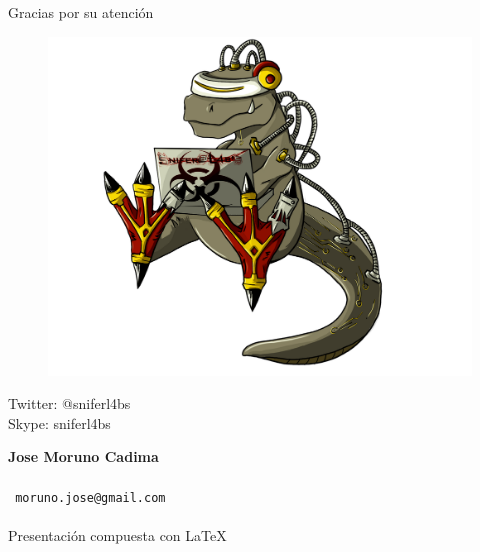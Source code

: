 \documentclass[12pt]{beamer} %
\makeatletter
\def\autor{
  Jose Moruno Cadima\\
}
\def\email{
  moruno.jose@gmail.com\\

}
\makeatother
\begin{document}
\begin{slide}
  \begin{exampleblock}{}
    LOS ACTOS PRESENTES DERIVAN LA SITUACION FUTURA.
  \end{exampleblock}}
\end{slide}



\begin{blankslide}
  \begin{center}
    {\Large Gracias por su atención}
  \end{center}
   \begin{figure}[h]
      \begin{center}
        \includegraphics[height=0.5\textheight]{img/sniferl4bs.png}
      \end{center}
    \end{figure}
  \begin{center}
    {\Large Twitter: @sniferl4bs}\\
    {\Large Skype:   sniferl4bs}
  \end{center}
  \begin{flushright}
    {\bf \autor}\\
    {\tt \email}\\[0.2cm]
    {\scriptsize Presentación compuesta con \LaTeX\ }
  \end{flushright}
\end{blankslide}
\end{document}
